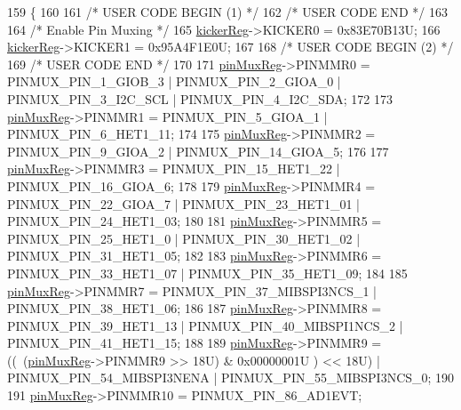 \begin{DoxyCode}
159                   \{
160 
161 \textcolor{comment}{/* USER CODE BEGIN (1) */}
162 \textcolor{comment}{/* USER CODE END */}
163 
164     \textcolor{comment}{/* Enable Pin Muxing */}
165     \mbox{\hyperlink{reg__pinmux_8h_a286f3b3064e923c24e41f9f680baf8ce}{kickerReg}}->KICKER0 = 0x83E70B13U;
166     \mbox{\hyperlink{reg__pinmux_8h_a286f3b3064e923c24e41f9f680baf8ce}{kickerReg}}->KICKER1 = 0x95A4F1E0U;
167     
168 \textcolor{comment}{/* USER CODE BEGIN (2) */}
169 \textcolor{comment}{/* USER CODE END */}
170 
171     \mbox{\hyperlink{reg__pinmux_8h_a489be2306394971fc7586946f88d6380}{pinMuxReg}}->PINMMR0 =    PINMUX\_PIN\_1\_GIOB\_3 | PINMUX\_PIN\_2\_GIOA\_0 | PINMUX\_PIN\_3\_I2C\_SCL | 
      PINMUX\_PIN\_4\_I2C\_SDA;
172     
173     \mbox{\hyperlink{reg__pinmux_8h_a489be2306394971fc7586946f88d6380}{pinMuxReg}}->PINMMR1 =    PINMUX\_PIN\_5\_GIOA\_1 | PINMUX\_PIN\_6\_HET1\_11;
174     
175     \mbox{\hyperlink{reg__pinmux_8h_a489be2306394971fc7586946f88d6380}{pinMuxReg}}->PINMMR2 =    PINMUX\_PIN\_9\_GIOA\_2 | PINMUX\_PIN\_14\_GIOA\_5;
176     
177     \mbox{\hyperlink{reg__pinmux_8h_a489be2306394971fc7586946f88d6380}{pinMuxReg}}->PINMMR3 =    PINMUX\_PIN\_15\_HET1\_22 | PINMUX\_PIN\_16\_GIOA\_6;
178     
179     \mbox{\hyperlink{reg__pinmux_8h_a489be2306394971fc7586946f88d6380}{pinMuxReg}}->PINMMR4 =    PINMUX\_PIN\_22\_GIOA\_7 | PINMUX\_PIN\_23\_HET1\_01 | PINMUX\_PIN\_24\_HET1\_03;
180     
181     \mbox{\hyperlink{reg__pinmux_8h_a489be2306394971fc7586946f88d6380}{pinMuxReg}}->PINMMR5 =    PINMUX\_PIN\_25\_HET1\_0 | PINMUX\_PIN\_30\_HET1\_02 | PINMUX\_PIN\_31\_HET1\_05;
182     
183     \mbox{\hyperlink{reg__pinmux_8h_a489be2306394971fc7586946f88d6380}{pinMuxReg}}->PINMMR6 =    PINMUX\_PIN\_33\_HET1\_07 | PINMUX\_PIN\_35\_HET1\_09;
184     
185     \mbox{\hyperlink{reg__pinmux_8h_a489be2306394971fc7586946f88d6380}{pinMuxReg}}->PINMMR7 =    PINMUX\_PIN\_37\_MIBSPI3NCS\_1 | PINMUX\_PIN\_38\_HET1\_06;
186     
187     \mbox{\hyperlink{reg__pinmux_8h_a489be2306394971fc7586946f88d6380}{pinMuxReg}}->PINMMR8 =    PINMUX\_PIN\_39\_HET1\_13 | PINMUX\_PIN\_40\_MIBSPI1NCS\_2 | 
      PINMUX\_PIN\_41\_HET1\_15;
188     
189     \mbox{\hyperlink{reg__pinmux_8h_a489be2306394971fc7586946f88d6380}{pinMuxReg}}->PINMMR9 = ((~(\mbox{\hyperlink{reg__pinmux_8h_a489be2306394971fc7586946f88d6380}{pinMuxReg}}->PINMMR9 >> 18U) & 0x00000001U ) << 18U) | 
      PINMUX\_PIN\_54\_MIBSPI3NENA | PINMUX\_PIN\_55\_MIBSPI3NCS\_0;
190     
191     \mbox{\hyperlink{reg__pinmux_8h_a489be2306394971fc7586946f88d6380}{pinMuxReg}}->PINMMR10 =   PINMUX\_PIN\_86\_AD1EVT;

\end{DoxyCode}
